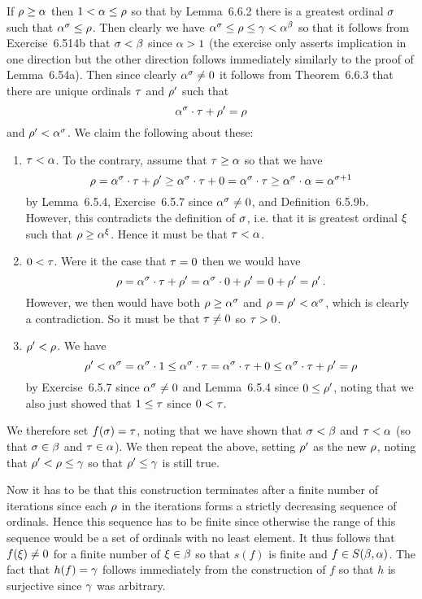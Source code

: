 \begin{solution}
    If $\rho \geq \alpha$ then $1 < \alpha \leq \rho$ so that by Lemma~6.6.2 there is a greatest ordinal $\sigma$ such that $\alpha^\sigma \leq \rho$.
    Then clearly we have $\alpha^\sigma \leq \rho \leq \gamma < \alpha^\beta$ so that it follows from Exercise~6.514b that $\sigma < \beta$ since $\alpha > 1$ (the exercise only asserts implication in one direction but the other direction follows immediately similarly to the proof of Lemma~6.54a).
    Then since clearly $\alpha^\sigma \neq 0$ it follows from Theorem~6.6.3 that there are unique ordinals $\tau$ and $\rho'$ such that
    $$
    \alpha^\sigma \cdot \tau + \rho' = \rho
    $$
    and $\rho' < \alpha^\sigma$.
    We claim the following about these:
    \begin{enumerate}
        \item $\tau < \alpha$.
        To the contrary, assume that $\tau \geq \alpha$ so that we have
        $$
        \rho = \alpha^\sigma \cdot \tau + \rho' \geq \alpha^\sigma \cdot \tau + 0 = \alpha^\sigma \cdot \tau \geq \alpha^\sigma \cdot \alpha = \alpha^{\sigma + 1}
        $$
        by Lemma~6.5.4, Exercise~6.5.7 since $\alpha^\sigma \neq 0$, and Definition~6.5.9b.
        However, this contradicts the definition of $\sigma$, i.e. that it is greatest ordinal $\xi$ such that $\rho \geq \alpha^\xi$.
        Hence it must be that $\tau < \alpha$.

        \item $0 < \tau$.
        Were it the case that $\tau = 0$ then we would have
        $$
        \rho = \alpha^\sigma \cdot \tau + \rho' = \alpha^\sigma \cdot 0 + \rho' = 0 + \rho' = \rho' \,.
        $$
        However, we then would have both $\rho \geq \alpha^\sigma$ and $\rho = \rho' < \alpha^\sigma$, which is clearly a contradiction.
        So it must be that $\tau \neq 0$ so $\tau > 0$.

        \item $\rho' < \rho$.
        We have
        $$
        \rho' < \alpha^\sigma = \alpha^\sigma \cdot 1 \leq \alpha^\sigma \cdot \tau = \alpha^\sigma \cdot \tau + 0 \leq \alpha^\sigma \cdot \tau + \rho' = \rho
        $$
        by Exercise~6.5.7 since $\alpha^\sigma \neq 0$ and Lemma~6.5.4 since $0 \leq \rho'$, noting that we also just showed that $1 \leq \tau$ since $0 < \tau$.
    \end{enumerate}

    We therefore set $f(\sigma) = \tau$, noting that we have shown that $\sigma < \beta$ and $\tau < \alpha$ (so that $\sigma \in \beta$ and $\tau \in \alpha$).
    We then repeat the above, setting $\rho'$ as the new $\rho$, noting that $\rho' < \rho \leq \gamma$ so that $\rho' \leq \gamma$ is still true.

    Now it has to be that this construction terminates after a finite number of iterations since each $\rho$ in the iterations forms a strictly decreasing sequence of ordinals.
    Hence this sequence has to be finite since otherwise the range of this sequence would be a set of ordinals with no least element.
    It thus follows that $f(\xi) \neq 0$ for a finite number of $\xi \in \beta$ so that $s(f)$ is finite and $f \in S(\beta,\alpha)$.
    The fact that $h(f) = \gamma$ follows immediately from the construction of $f$ so that $h$ is surjective since $\gamma$ was arbitrary. \qedsymbol


\end{solution}
